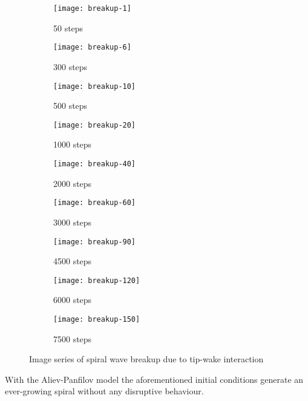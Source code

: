 \begin{figure}[h]
    \centering
    \begin{subfigure}[b]{.3\textwidth}
        \texttt{[image: breakup-1]}
        \vspace{-\baselineskip}
        \caption{50 steps}
    \end{subfigure}
    \begin{subfigure}[b]{.3\textwidth}
        \texttt{[image: breakup-6]}
        \vspace{-\baselineskip}
        \caption{300 steps}
    \end{subfigure}
    \begin{subfigure}[b]{.3\textwidth}
        \texttt{[image: breakup-10]}
        \vspace{-\baselineskip}
        \caption{500 steps}
    \end{subfigure}
    \begin{subfigure}[b]{.3\textwidth}
        \texttt{[image: breakup-20]}
        \vspace{-\baselineskip}
        \caption{1000 steps}
    \end{subfigure}
    \begin{subfigure}[b]{.3\textwidth}
        \texttt{[image: breakup-40]}
        \vspace{-\baselineskip}
        \caption{2000 steps}
    \end{subfigure}
    \begin{subfigure}[b]{.3\textwidth}
        \texttt{[image: breakup-60]}
        \vspace{-\baselineskip}
        \caption{3000 steps}
    \end{subfigure}
    \begin{subfigure}[b]{.3\textwidth}
        \texttt{[image: breakup-90]}
        \vspace{-\baselineskip}
        \caption{4500 steps}
    \end{subfigure}
    \begin{subfigure}[b]{.3\textwidth}
        \texttt{[image: breakup-120]}
        \vspace{-\baselineskip}
        \caption{6000 steps}
    \end{subfigure}
    \begin{subfigure}[b]{.3\textwidth}
        \texttt{[image: breakup-150]}
        \vspace{-\baselineskip}
        \caption{7500 steps}
    \end{subfigure}
    \label{fig:breakup}
    \caption{Image series of spiral wave breakup due to tip-wake interaction}
\end{figure}

With the Aliev-Panfilov model the aforementioned initial conditions generate
an ever-growing spiral without any disruptive behaviour.



